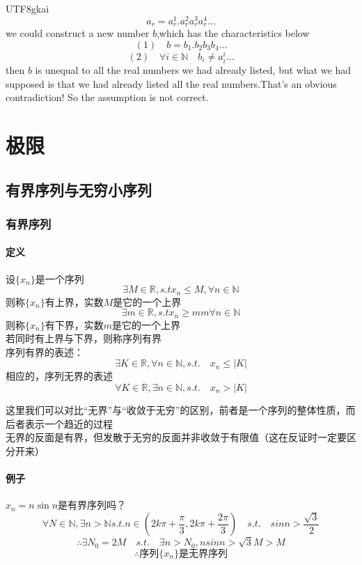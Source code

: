 \documentclass{article}
\begin{document}
\begin{CJK}{UTF8}{gkai}
\[a_r=a_r^1.   a_r^2   a_r^3   a_r^4  \dots\]
we could construct a new number $b$,which has the characteristics below
\[(1) \quad  b=b_1.b_2b_3b_4\dots\]
\[(2) \quad  \forall i \in \mathbb{N} \quad  b_i\neq a_i^i \dots\]
then $b$ is unequal to all the real numbers we had already listed, but what we had supposed is that we had already listed all the real numbers.That's an obvious contradiction!
So the assumption is not correct.

\newpage
\section{极限}
\subsection{有界序列与无穷小序列}
\subsubsection{有界序列}
\paragraph{定义\\}

设$\{x_n\}$是一个序列\\
\[\exists M\in\mathbb{R},s.t x_n\leq M ,\forall n\in \mathbb{N}\]
则称$\{x_n\}$有上界，实数$M$是它的一个上界
\[\exists m\in\mathbb{R},s.t x_n\geq m m\forall n\in \mathbb{N}\]
则称$\{x_n\}$有下界，实数$m$是它的一个上界\\
若同时有上界与下界，则称序列有界\\
序列有界的表述：
\[\exists K\in \mathbb{R},\forall n\in \mathbb{N},s.t.\quad x_n\leq |K|\]
相应的，序列无界的表述
\[\forall K\in \mathbb{R},\exists n\in \mathbb{N},s.t.\quad  x_n  >  |K|\]

这里我们可以对比“无界”与“收敛于无穷”的区别，前者是一个序列的整体性质，而后者表示一个趋近的过程\\
无界的反面是有界，但发散于无穷的反面并非收敛于有限值（这在反证时一定要区分开来）\\
\paragraph{例子\\}

$x_n=n\sin n$是有界序列吗？
\[\forall N \in \mathbb{N} ,\exists n> \mathbb{N} s. t. n \in (2k\pi+\frac{\pi}{3},2k\pi+\frac{2\pi}{3})\quad  s.t. \quad  sin n>\frac{\sqrt{3}}{2}\]
\[\therefore \exists N_0=2M \quad  s.t.\quad \exists n>N_0,nsin n > \sqrt{3}M>M\]
\[\therefore \text{序列} \{x_n\} \text{是无界序列}\]



\end{CJK}
\end{document}
